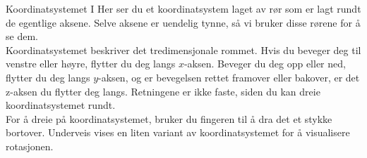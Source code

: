 \begin{surferPage}{Koordinatsystemet I}
Her ser du et koordinatsystem laget av rør som er lagt rundt de egentlige aksene. Selve aksene er uendelig tynne, så vi bruker disse rørene for å se dem.\\
Koordinatsystemet beskriver det tredimensjonale rommet. Hvis du beveger deg til venstre eller høyre, flytter du deg langs $x$-aksen. Beveger du deg opp eller ned, flytter du deg langs $y$-aksen, 
og er bevegelsen rettet framover eller bakover, er det z-aksen du flytter deg langs. Retningene er ikke faste, siden du kan dreie koordinatsystemet rundt. \\

\vspace{0.3cm}
For å dreie på koordinatsystemet, bruker du fingeren til å dra det et stykke bortover. Underveis vises en liten variant av koordinatsystemet for å visualisere rotasjonen.
\end{surferPage}
